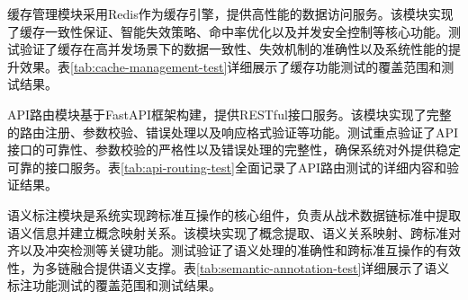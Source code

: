 缓存管理模块采用Redis作为缓存引擎，提供高性能的数据访问服务。该模块实现了缓存一致性保证、智能失效策略、命中率优化以及并发安全控制等核心功能。测试验证了缓存在高并发场景下的数据一致性、失效机制的准确性以及系统性能的提升效果。表\ref{tab:cache-management-test}详细展示了缓存功能测试的覆盖范围和测试结果。

\begin{table}[H]
\centering
\caption{缓存管理模块单元测试结果}
\label{tab:cache-management-test}
\end{table}

API路由模块基于FastAPI框架构建，提供RESTful接口服务。该模块实现了完整的路由注册、参数校验、错误处理以及响应格式验证等功能。测试重点验证了API接口的可靠性、参数校验的严格性以及错误处理的完整性，确保系统对外提供稳定可靠的接口服务。表\ref{tab:api-routing-test}全面记录了API路由测试的详细内容和验证结果。

\begin{table}[H]
\centering
\caption{API路由模块单元测试结果}
\label{tab:api-routing-test}
\end{table}

语义标注模块是系统实现跨标准互操作的核心组件，负责从战术数据链标准中提取语义信息并建立概念映射关系。该模块实现了概念提取、语义关系映射、跨标准对齐以及冲突检测等关键功能。测试验证了语义处理的准确性和跨标准互操作的有效性，为多链融合提供语义支撑。表\ref{tab:semantic-annotation-test}详细展示了语义标注功能测试的覆盖范围和测试结果。

